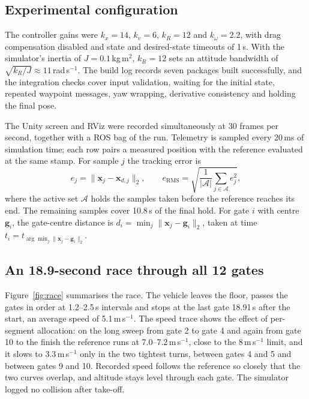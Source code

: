 \documentclass[12pt,a4paper,twoside]{article}
\begin{document}
\subsection{Experimental configuration}
The controller gains were $k_x=14$, $k_v=6$, $k_R=12$ and
$k_\omega=2.2$, with drag compensation disabled and state and desired-state
timeouts of 1\,s. With the simulator's inertia of $J=0.1$\,kg\,m$^2$, $k_R=12$
sets an attitude bandwidth of $\sqrt{k_R/J}\approx11$\,rad\,s$^{-1}$. The build log
records seven packages built successfully, and the integration checks cover input
validation, waiting for the initial state, repeated waypoint messages, yaw
wrapping, derivative consistency and holding the final pose.

The Unity screen and RViz were recorded simultaneously at 30 frames per second,
together with a ROS bag of the run. Telemetry is sampled every 20\,ms of
simulation time; each row pairs a measured position with the
reference evaluated at the same stamp. For sample $j$ the tracking error is
\begin{equation}
e_j=\lVert\boldsymbol x_j-\boldsymbol x_{d,j}\rVert_2,\qquad
e_{\mathrm{RMS}}=\sqrt{\frac{1}{|\mathcal A|}\sum_{j\in\mathcal A}e_j^2},
\end{equation}
where the active set $\mathcal A$ holds the samples taken before the
reference reaches its end. The remaining samples cover 10.8\,s of the final
hold. For gate $i$ with centre $\boldsymbol g_i$, the gate-centre distance is
$d_i=\min_j\lVert\boldsymbol x_j-\boldsymbol g_i\rVert_2$, taken at time
$t_i=t_{\arg\min_j\lVert\boldsymbol x_j-\boldsymbol g_i\rVert_2}$.

\subsection{An 18.9-second race through all 12 gates}
Figure~\ref{fig:race} summarises the race. The vehicle leaves the floor, passes
the gates in order at 1.2--2.5\,s intervals and stops at the last gate 18.91\,s
after the start, an average speed of 5.1\,m\,s$^{-1}$. The speed trace shows the
effect of per-segment allocation: on the long sweep from gate 2 to gate 4 and
again from gate 10 to the finish the reference runs at 7.0--7.2\,m\,s$^{-1}$,
close to the 8\,m\,s$^{-1}$ limit, and it slows to 3.3\,m\,s$^{-1}$ only in the
two tightest turns, between gates 4 and 5 and between gates 9 and 10. Recorded speed follows the reference so closely that
the two curves overlap, and altitude stays level through each gate. The
simulator logged no collision after take-off.
\end{document}
